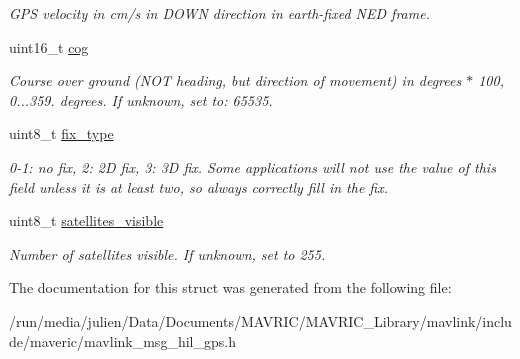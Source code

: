 \begin{DoxyCompactItemize}
\begin{DoxyCompactList}\small\item\em G\+P\+S velocity in cm/s in D\+O\+W\+N direction in earth-\/fixed N\+E\+D frame. \end{DoxyCompactList}\item 
\hypertarget{struct____mavlink__hil__gps__t_a7a0d3eba01b2e7cb3fb52d10192a7881}{uint16\+\_\+t \hyperlink{struct____mavlink__hil__gps__t_a7a0d3eba01b2e7cb3fb52d10192a7881}{cog}}\label{struct____mavlink__hil__gps__t_a7a0d3eba01b2e7cb3fb52d10192a7881}

\begin{DoxyCompactList}\small\item\em Course over ground (N\+O\+T heading, but direction of movement) in degrees $\ast$ 100, 0...359. degrees. If unknown, set to\+: 65535. \end{DoxyCompactList}\item 
\hypertarget{struct____mavlink__hil__gps__t_ab823793fa4f3c3f56b1879faedc8776e}{uint8\+\_\+t \hyperlink{struct____mavlink__hil__gps__t_ab823793fa4f3c3f56b1879faedc8776e}{fix\+\_\+type}}\label{struct____mavlink__hil__gps__t_ab823793fa4f3c3f56b1879faedc8776e}

\begin{DoxyCompactList}\small\item\em 0-\/1\+: no fix, 2\+: 2\+D fix, 3\+: 3\+D fix. Some applications will not use the value of this field unless it is at least two, so always correctly fill in the fix. \end{DoxyCompactList}\item 
\hypertarget{struct____mavlink__hil__gps__t_a9128f6bd8c708d5990adbfce55365577}{uint8\+\_\+t \hyperlink{struct____mavlink__hil__gps__t_a9128f6bd8c708d5990adbfce55365577}{satellites\+\_\+visible}}\label{struct____mavlink__hil__gps__t_a9128f6bd8c708d5990adbfce55365577}

\begin{DoxyCompactList}\small\item\em Number of satellites visible. If unknown, set to 255. \end{DoxyCompactList}\end{DoxyCompactItemize}


The documentation for this struct was generated from the following file\+:\begin{DoxyCompactItemize}
\item 
/run/media/julien/\+Data/\+Documents/\+M\+A\+V\+R\+I\+C/\+M\+A\+V\+R\+I\+C\+\_\+\+Library/mavlink/include/maveric/mavlink\+\_\+msg\+\_\+hil\+\_\+gps.\+h\end{DoxyCompactItemize}
